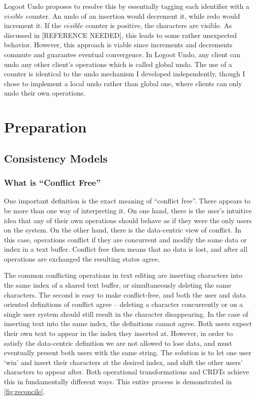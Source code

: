 \documentclass[12pt,a4paper,twoside,openright]{report}
\begin{document}
Logoot Undo \cite{weiss2010undo} proposes to resolve this by essentially tagging each identifier with a $visible$ counter. An undo of an insertion would decrement it, while redo would increment it. If the $visible$ counter is positive, the characters are visible. As discussed in [REFERENCE NEEDED], this leads to some rather unexpected behavior. However, this approach is viable since increments and decrements commute and guarantee eventual convergence. In Logoot Undo, any client can undo any other client's operations which is called global undo. The use of a counter is identical to the undo mechanism I developed independently, though I chose to implement a local undo rather than global one, where clients can only undo their own operations.


\chapter{Preparation}


\section{Consistency Models}

	\subsection{What is ``Conflict Free''}
	
	One important definition is the exact meaning of ``conflict free''. There appears to be more than one way of interpreting it. On one hand, there is the user's intuitive idea that any of their own operations should behave as if they were the only users on the system. On the other hand, there is the data-centric view of conflict. In this case, operations conflict if they are concurrent and modify the same data or index in a text buffer. Conflict free then means that no data is lost, and after all operations are exchanged the resulting states agree.
	
	The common conflicting operations in text editing are inserting characters into the same index of a shared text buffer, or simultaneously deleting the same characters. The second is easy to make conflict-free, and both the user and data oriented definitions of conflict agree -- deleting a character concurrently or on a single user system should still result in the character disappearing. In the case of inserting text into the same index, the definitions cannot agree. Both users expect their own text to appear in the index they inserted at. However, in order to satisfy the data-centric definition we are not allowed to lose data, and must eventually present both users with the same string. The solution is to let one user `win' and insert their characters at the desired index, and shift the other users' characters to appear after. Both operational transformations and CRDTs achieve this in fundamentally different ways. This entire process is demonstrated in  \ref{fig:reconcile}.
	
\end{document}
